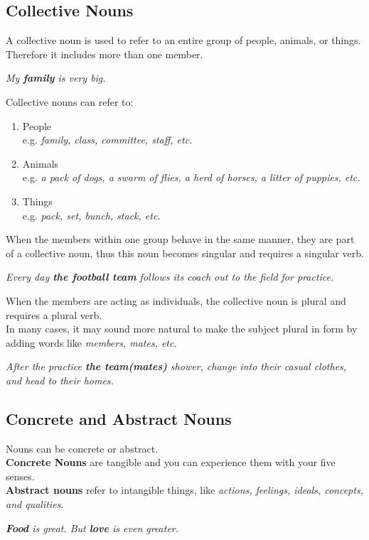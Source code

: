 \documentclass[hidelinks,10pt,a4paper]{article}
\begin{document}
\subsection{Collective Nouns}
A collective noun is used to refer to an entire group of people, animals, or things.\\
Therefore it includes more than one member.

\begin{center}
		\textit{My \textbf{family} is very big.}
\end{center}

Collective nouns can refer to:
\begin{enumerate}[label=\alph*)]
		\item People\\
				e.g. \textit{family, class, committee, staff, etc.}
		\item Animals\\
				e.g. \textit{a pack of dogs, a swarm of flies, a herd of horses, a litter of puppies, etc.}
		\item Things\\
				e.g. \textit{pack, set, bunch, stack, etc.}
\end{enumerate}
\newpage
When the members within one group behave in the same manner, they are part of a collective noun, thus this noun becomes singular and requires a singular verb.
\begin{center}
		\textit{Every day \textbf{the football team} follows its coach out to the field for practice.}
\end{center}

When the members are acting as individuals, the collective noun is plural and requires a plural verb.\\
In many cases, it may sound more natural to make the subject plural in form by adding words like \textit{members, mates, etc.}
\begin{center}
		\textit{After the practice \textbf{the team(mates)} shower, change into their casual clothes, and head to their homes.}
\end{center}

\subsection{Concrete and Abstract Nouns}
\hspace{0.8cm} Nouns can be concrete or abstract. \\
\textbf{Concrete Nouns} are tangible and you can experience them with your five senses.\\
\textbf{Abstract nouns} refer to intangible things, like \textit{actions, feelings, ideals, concepts, and qualities}.
\begin{center}
		\textit{ \textbf{Food} is great. But \textbf{love} is even greater.}
\end{center}
\end{document}
